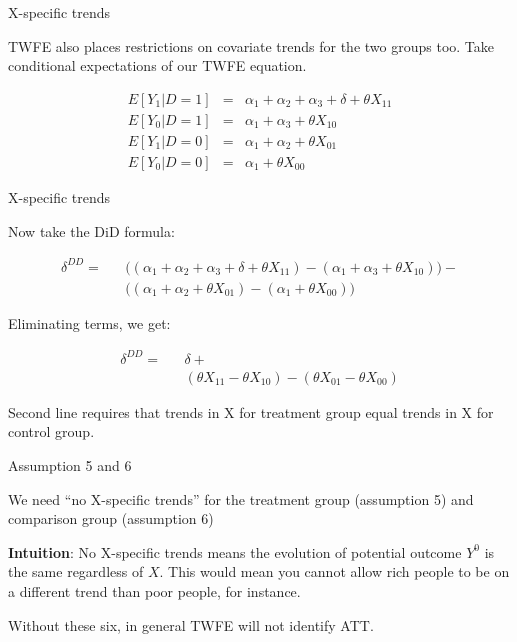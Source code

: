 \documentclass{beamer}
\begin{document}
\begin{frame}{X-specific trends}

TWFE also places restrictions on covariate trends for the two groups too.  Take conditional expectations of our TWFE equation. 

\begin{eqnarray*}
E[Y_1|D=1] &=& \alpha_1 + \alpha_2 + \alpha_3 + \delta + \theta X_{11} \\
E[Y_0|D=1] &=& \alpha_1 + \alpha_3 + \theta X_{10} \\
E[Y_1|D=0] &=& \alpha_1 + \alpha_2 + \theta X_{01} \\
E[Y_0|D=0] &=& \alpha_1 + \theta X_{00}
\end{eqnarray*}


\end{frame}


\begin{frame}{X-specific trends}

Now take the DiD formula:

\begin{eqnarray*}
\delta^{DD} = &&\bigg ( (\alpha_1 + \alpha_2 + \alpha_3 + \delta + \theta X_{11} ) - (\alpha_1 + \alpha_3 + \theta X_{10} ) \bigg )- \\
&& \bigg ( (\alpha_1 + \alpha_2 + \theta X_{01}) - (\alpha_1 + \theta X_{00}) \bigg )
\end{eqnarray*}

\bigskip

Eliminating terms, we get:

\begin{eqnarray*}
\delta^{DD} = &&\delta + \\
&& (\theta X_{11} - \theta X_{10} ) - (\theta X_{01} - \theta X_{00} )
\end{eqnarray*}

\bigskip

Second line requires that trends in X for treatment group equal trends in X for control group.

\end{frame}


\begin{frame}{Assumption 5 and 6}

We need ``no X-specific trends'' for the treatment group (assumption 5) and comparison group (assumption 6)

\bigskip

\textbf{Intuition}: No X-specific trends means the evolution of potential outcome $Y^0$ is the same regardless of $X$. This would mean you cannot allow rich people to be on a different trend than poor people, for instance.

\bigskip

Without these six, in general TWFE will not identify ATT. 

\end{frame}
\end{document}
